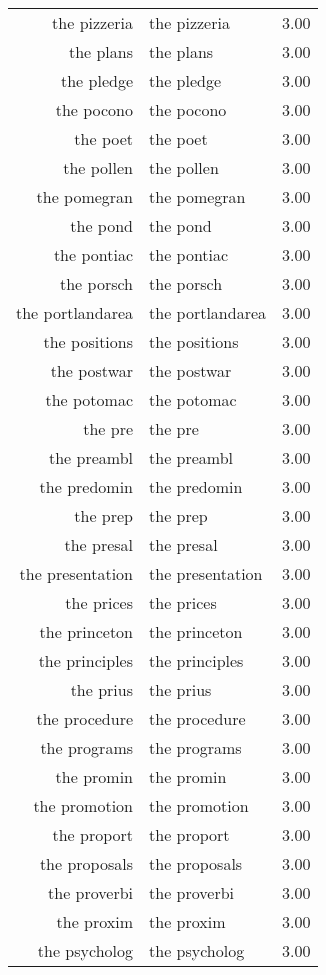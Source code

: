 \begin{table}[ht]
\begin{tabular}{rlr}
  the pizzeria & the pizzeria & 3.00 \\ 
  the plans & the plans & 3.00 \\ 
  the pledge & the pledge & 3.00 \\ 
  the pocono & the pocono & 3.00 \\ 
  the poet & the poet & 3.00 \\ 
  the pollen & the pollen & 3.00 \\ 
  the pomegran & the pomegran & 3.00 \\ 
  the pond & the pond & 3.00 \\ 
  the pontiac & the pontiac & 3.00 \\ 
  the porsch & the porsch & 3.00 \\ 
  the portlandarea & the portlandarea & 3.00 \\ 
  the positions & the positions & 3.00 \\ 
  the postwar & the postwar & 3.00 \\ 
  the potomac & the potomac & 3.00 \\ 
  the pre & the pre & 3.00 \\ 
  the preambl & the preambl & 3.00 \\ 
  the predomin & the predomin & 3.00 \\ 
  the prep & the prep & 3.00 \\ 
  the presal & the presal & 3.00 \\ 
  the presentation & the presentation & 3.00 \\ 
  the prices & the prices & 3.00 \\ 
  the princeton & the princeton & 3.00 \\ 
  the principles & the principles & 3.00 \\ 
  the prius & the prius & 3.00 \\ 
  the procedure & the procedure & 3.00 \\ 
  the programs & the programs & 3.00 \\ 
  the promin & the promin & 3.00 \\ 
  the promotion & the promotion & 3.00 \\ 
  the proport & the proport & 3.00 \\ 
  the proposals & the proposals & 3.00 \\ 
  the proverbi & the proverbi & 3.00 \\ 
  the proxim & the proxim & 3.00 \\ 
  the psycholog & the psycholog & 3.00 \\ 

\end{tabular}
\end{table}
